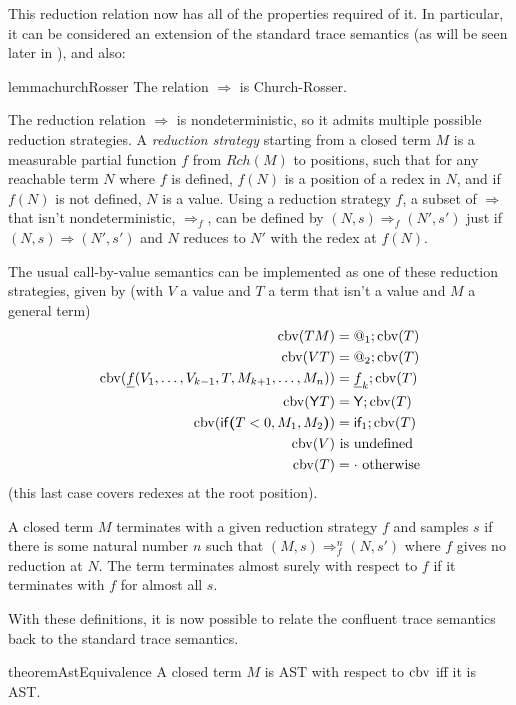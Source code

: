 \medskip
This reduction relation now has all of the properties required of it. In particular, it can be considered an extension of the standard trace semantics (as will be seen later in ), and also:
\begin{restatable}{lemma}{churchRosser} \label{churchRosser}
The relation $\Rightarrow$ is Church-Rosser.
\end{restatable}

\medskip
The reduction relation $\Rightarrow$ is nondeterministic, so it admits multiple possible reduction strategies. 
A \emph{reduction strategy} starting from a closed term $M$ is a measurable partial function $f$ from $\mathit{Rch}(M)$ to positions, such that for any reachable term $N$ where $f$ is defined, $f(N)$ is a position of a redex in $N$, and if $f(N)$ is not defined, $N$ is a value.
Using a reduction strategy $f$, a subset of $\Rightarrow$ that isn't nondeterministic, $\Rightarrow_f$, can be defined by $(N,s) \Rightarrow_f (N',s')$ just if $(N,s) \Rightarrow (N',s')$ and $N$ reduces to $N'$ with the redex at $f(N)$.

The usual call-by-value semantics can be implemented as one of these reduction strategies, given by (with $V$ a value and $T$ a term that isn't a value and $M$ a general term)
\begin{align*}
\operatorname{cbv}(T M) & = @_1 ; \operatorname{cbv}(T) \\
\operatorname{cbv}(V T) & = @_2 ; \operatorname{cbv}(T) \\
\operatorname{cbv}(\underline f(V_1, \dots, V_{k-1}, T, M_{k+1}, \dots, M_n)) & = \underline f_k ; \operatorname{cbv}(T) \\
\operatorname{cbv}(\mathsf{Y} T) & = \mathsf{Y} ; \operatorname{cbv}(T) \\
\operatorname{cbv}(\mathsf{if}\boldsymbol{(}T < 0, M_1, M_2\boldsymbol{)}) & = \textsf{if}_1 ; \operatorname{cbv}(T) \\
\operatorname{cbv}(V) & \text{ is undefined} \\
\operatorname{cbv}(T) & = \cdot \text{ otherwise}
\end{align*}
(this last case covers redexes at the root position).

A closed term $M$ terminates with a given reduction strategy $f$ and samples $s$ if there is some natural number $n$ such that $(M,s) \Rightarrow_f^n (N,s')$ where $f$ gives no reduction at $N$. The term terminates almost surely with respect to $f$ if it terminates with $f$ for almost all $s$.

With these definitions, it is now possible to relate the confluent trace semantics back to the standard trace semantics.

\begin{restatable}{theorem}{AstEquivalence} \label{thm:AstEquivalence}
A closed term $M$ is AST with respect to $\operatorname{cbv}$ iff it is AST.
\end{restatable}

